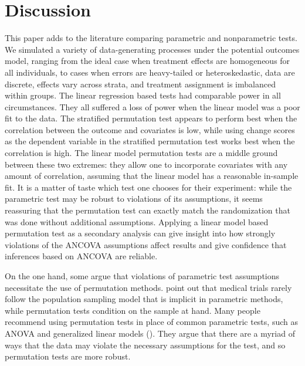 \documentclass[12pt]{article}
\begin{document}
\section{Discussion}\label{sec:discussion}



This paper adds to the literature comparing parametric and nonparametric tests.
We simulated a variety of data-generating processes under the potential outcomes model, ranging from the ideal case when treatment effects are homogeneous for all individuals, to cases when errors are heavy-tailed or heteroskedastic, data are discrete, effects vary across strata, and treatment assignment is imbalanced within groups.
The linear regression based tests had comparable power in all circumstances.
They all suffered a loss of power when the linear model was a poor fit to the data.
The stratified permutation test appears to perform best when the correlation between the outcome and covariates is low, while using change scores as the dependent variable in the stratified permutation test works best when the correlation is high.
The linear model permutation tests are a middle ground between these two extremes: they allow one to incorporate covariates with any amount of correlation, assuming that the linear model has a reasonable in-sample fit.
It is a matter of taste which test one chooses for their experiment: while the parametric test may be robust to violations of its assumptions, it seems reassuring that the permutation test can exactly match the randomization that was done without additional assumptions.
Applying a linear model based permutation test as a secondary analysis can give insight into how strongly violations of the ANCOVA assumptions affect results
and give confidence that inferences based on ANCOVA are reliable.


On the one hand, some argue that violations of parametric test assumptions necessitate the use of permutation methods.
\cite{ludbrook_why_1998} point out that medical trials rarely follow the population sampling model that is implicit in parametric methods, while permutation tests condition on the sample at hand.
Many people recommend using permutation tests in place of common parametric tests, such as ANOVA and generalized linear models (\cite{still_approximate_1981, winkler_permutation_2014}).
They argue that there are a myriad of ways that the data may violate the necessary assumptions for the test, and so permutation tests are more robust.
\end{document}
